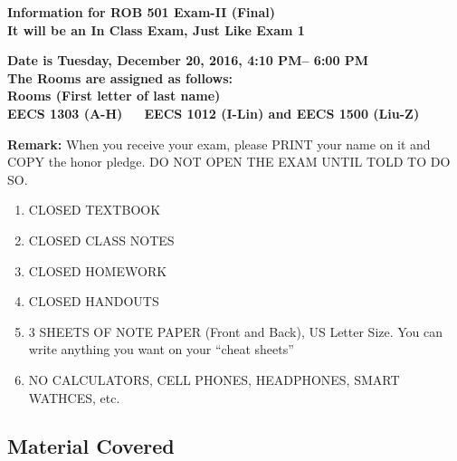 \documentclass[letterpaper]{article}
\begin{document}



\vspace*{.1in}
\begin{center}
\LARGE \bf
Information for ROB 501 Exam-II (Final)\\
\large
It will be an In Class Exam, Just Like Exam 1
\end{center}
\vspace*{1in}

\begin{center}
\LARGE \bf
Date is Tuesday, December 20, 2016, 4:10 PM-- 6:00 PM \\
\large
The Rooms are assigned as follows: \\
Rooms (First letter of last name)\\
EECS 1303 (A-H)~~~EECS 1012 (I-Lin) and EECS 1500 (Liu-Z) \\
\end{center}
\vspace*{2in}

\noindent \textbf{Remark:} When you receive your exam, please PRINT your name on it and COPY the honor pledge. DO NOT OPEN THE EXAM UNTIL TOLD TO DO SO.



\vspace*{1in} 
\begin{enumerate}
\item CLOSED TEXTBOOK
\item CLOSED CLASS NOTES
\item CLOSED HOMEWORK
\item CLOSED HANDOUTS
\item  3  SHEETS OF NOTE PAPER (Front and Back), US Letter Size. You can write anything you want on your ``cheat sheets''
\item NO CALCULATORS, CELL PHONES, HEADPHONES, SMART WATHCES, etc.
\end{enumerate}
\vspace*{.4in}


\newpage
\subsection*{Material Covered}
\end{document}
